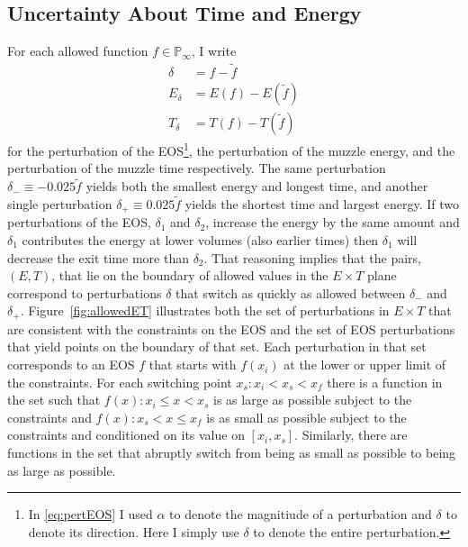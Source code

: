 \documentclass[]{article}
\newcommand{\nomf}{\tilde f} \newcommand{\COST}{\cal C}
\newcommand{\field}[1]{\mathbb{#1}}
\newcommand\Polytope[1]{\field{P}_{#1}}
\newcommand\PolytopeInf{\Polytope{\infty}}
\newcommand\fracerror{0.025}
\begin{document}
\subsection{Uncertainty About Time and Energy}
\label{sec:uncertainTE}

For each allowed function $f \in \PolytopeInf$, I write
\begin{align*}
  \delta &= f - \nomf \\
  E_\delta &= E(f) - E(\nomf) \\
  T_\delta &= T(f) - T(\nomf)
\end{align*}
for the perturbation of the EOS\footnote{In \eqref{eq:pertEOS} I used
  $\alpha$ to denote the magnitiude of a perturbation and $\delta$ to
  denote its direction.  Here I simply use $\delta$ to denote the
  entire perturbation.}, the perturbation of the muzzle energy, and
the perturbation of the muzzle time respectively.  The same
perturbation $\delta_- \equiv -\fracerror \nomf$ yields both the
smallest energy and longest time, and another single perturbation
$\delta_+ \equiv \fracerror \nomf$ yields the shortest time and
largest energy.  If two perturbations of the EOS, $\delta_1$ and
$\delta_2$, increase the energy by the same amount and $\delta_1$
contributes the energy at lower volumes (also earlier times) then
$\delta_1$ will decrease the exit time more than $\delta_2$.  That
reasoning implies that the pairs, $(E,T)$, that lie on the boundary of
allowed values in the $E\times T$ plane correspond to perturbations
$\delta$ that switch as quickly as allowed between $\delta_-$ and
$\delta_+$.  Figure~\ref{fig:allowedET} illustrates both the set of
perturbations in $E\times T$ that are consistent with the constraints
on the EOS and the set of EOS perturbations that yield points on the
boundary of that set.  Each perturbation in that set corresponds to an
EOS $f$ that starts with $f(x_i)$ at the lower or upper limit of the
constraints.  For each switching point $x_s: x_i < x_s < x_f$ there is
a function in the set such that $f(x): x_i \leq x < x_s$ is as large
as possible subject to the constraints and $f(x): x_s < x \leq x_f$ is
as small as possible subject to the constraints and conditioned on its
value on $[x_i,x_s]$.  Similarly, there are functions in the set that
abruptly switch from being as small as possible to being as large as
possible.
\end{document}
